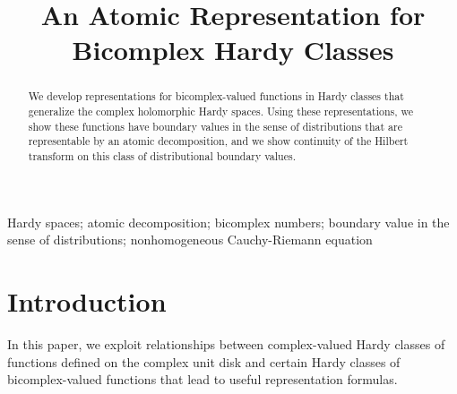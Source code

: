 \documentclass[suppldata]{interact}
\theoremstyle{plain}%
\theoremstyle{definition}
\theoremstyle{remark}
\begin{document}

\title{An Atomic Representation for Bicomplex Hardy Classes}

\author{
}

\maketitle

\begin{abstract}
We develop representations for bicomplex-valued functions in Hardy classes that generalize the complex holomorphic Hardy spaces. Using these representations, we show these functions have boundary values in the sense of distributions that are representable by an atomic decomposition, and we show continuity of the Hilbert transform on this class of distributional boundary values. 
\end{abstract}

\begin{keywords}
Hardy spaces; atomic decomposition; bicomplex numbers; boundary value in the sense of distributions; nonhomogeneous Cauchy-Riemann equation
\end{keywords}



\section{Introduction}

In this paper, we exploit relationships between complex-valued Hardy classes of functions defined on the complex unit disk and certain Hardy classes of bicomplex-valued functions that lead to useful representation formulas. 
\end{document}
